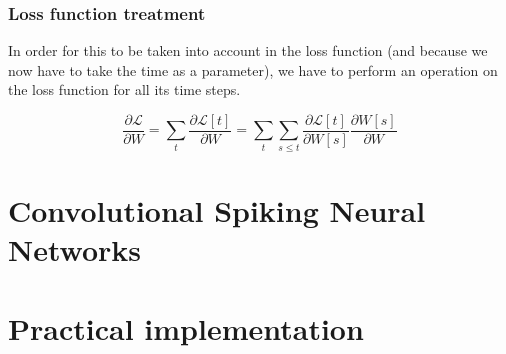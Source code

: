 \documentclass[11pt]{article}
\begin{document}
\subsubsection{Loss function treatment}

In order for this to be taken into account in the loss function (and because we now have to take the time as a parameter), we have to perform an operation on the loss function for all its time steps.

$$ \frac{\partial \mathcal{L}}{\partial W}=\sum_t \frac{\partial\mathcal{L}[t]}{\partial W} =
\sum_t \sum_{s\leq t} \frac{\partial\mathcal{L}[t]}{\partial W[s]}\frac{\partial W[s]}{\partial W}$$

\section{Convolutional Spiking Neural Networks}

\section{Practical implementation}
\end{document}
